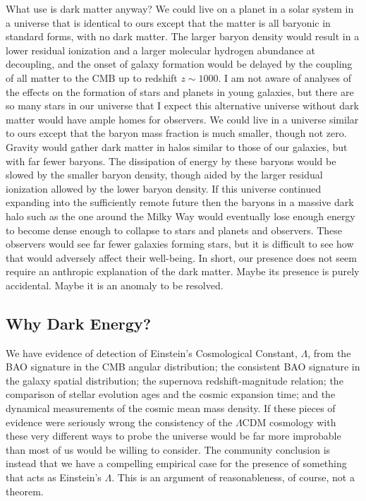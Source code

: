 \documentclass[fleqn,usenatbib]{mnras}
\begin{document}
What use is dark matter anyway? We could live on a planet in a solar system in a universe that is identical to ours except that the matter is all baryonic in standard forms, with no dark matter. The larger baryon density would result in a lower residual ionization and a larger molecular hydrogen abundance at decoupling, and the onset of galaxy formation would be delayed by the coupling of all matter to the CMB up to redshift $z\sim 1000$. I am not aware of analyses of the effects on the formation of stars and planets in young galaxies, but there are so many stars in our universe that I expect this alternative universe without dark matter would have ample homes for observers. We could live in a universe similar to ours except that the baryon mass fraction is much smaller, though not zero. Gravity would gather dark matter in halos similar to those of our galaxies, but with far fewer baryons. The dissipation of energy by these baryons would be slowed by the smaller baryon density, though aided by the larger residual ionization allowed by the lower baryon density. If this universe continued expanding into the sufficiently remote future then the baryons in a massive dark halo such as the one around the Milky Way would eventually lose enough energy to become dense enough to collapse to stars and planets and observers. These observers would see far fewer galaxies forming stars, but it is difficult to see how that would adversely affect their well-being. In short, our presence does not seem require an anthropic explanation of the dark matter. Maybe its presence  is purely accidental. Maybe it is an anomaly to be resolved.

\subsection{Why Dark Energy?}\label{sec:Lambda} 

We have evidence of detection of Einstein's Cosmological Constant, $\Lambda$, from the BAO signature in the CMB angular distribution; the consistent BAO signature in the galaxy spatial distribution; the supernova redshift-magnitude relation; the comparison of stellar evolution ages and the cosmic expansion time; and the dynamical measurements of the cosmic mean mass density. If these pieces of evidence were seriously wrong the consistency of the $\Lambda$CDM cosmology with these very different ways to probe the universe would be far more improbable than most of us would be willing to consider. The community  conclusion is instead that we have a compelling empirical case for the presence of something that acts as Einstein's $\Lambda$. This is an argument of reasonableness, of course, not a theorem.
\end{document}
